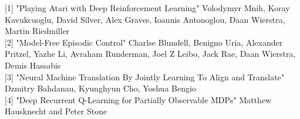\documentclass{article}
\begin{document}
[1] "Playing Atari with Deep Reinforcement Learning" Volodymyr Mnih, Koray Kavukcuoglu, David Silver, Alex Graves, Ioannis Antonoglou, Daan Wierstra, Martin Riedmiller \\

[2] "Model-Free Episodic Control" Charlse Blundell, Benigno Uria, Alexander Pritzel, Yazhe Li, Avraham Runderman, Joel Z Leibo, Jack Rae, Daan Wierstra, Demis Hassabis \\

[3] "Neural Machine Translation By Jointly Learning To Align and Translate" Dzmitry Bahdanau, Kyunghyun Cho, Yoshua Bengio \\

[4] "Deep Recurrent Q-Learning for Partially Observable MDPs" Matthew Hausknecht and Peter Stone
\end{document}
